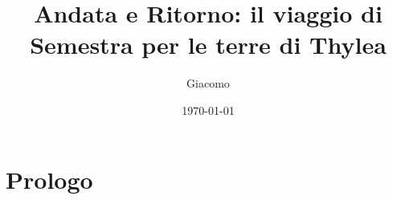 \documentclass[letterpaper,twocolumn,openany,nodeprecatedcode]{dndbook}
\title{Andata e Ritorno: il viaggio di Semestra per le terre di Thylea}
\author{Giacomo}
\date{\today}
\begin{document}
\frontmatter

\maketitle

\tableofcontents

\mainmatter%

\chapter{Prologo}
\end{document}
